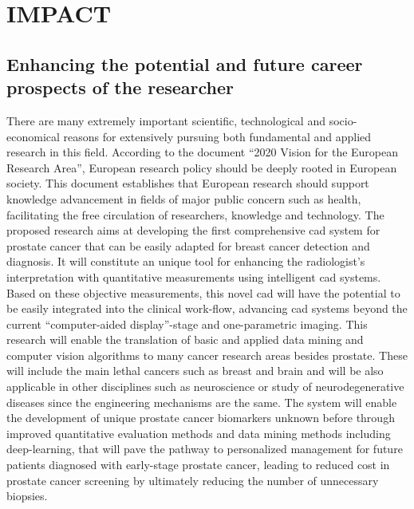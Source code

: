 \section{IMPACT}
\label{sec:impact}

\subsection{Enhancing the potential and future career prospects of the researcher}
\label{sec:enhancement}

There are many extremely important scientific, technological and socio-economical reasons for extensively pursuing both fundamental and applied research in this field.
According to the document ``2020 Vision for the European Research Area'', European research policy should be deeply rooted in European society.
This document establishes that European research should support knowledge advancement in fields of major public concern such as health, facilitating the free circulation of researchers, knowledge and technology.
The proposed research aims at developing the first comprehensive \ac{cad} system for prostate cancer that can be easily adapted for breast cancer detection and diagnosis.
It will constitute an unique tool for enhancing the radiologist's interpretation with quantitative measurements using intelligent \ac{cad} systems.
Based on these objective measurements, this novel \ac{cad} will have the potential to be easily integrated into the clinical work-flow, advancing \ac{cad} systems beyond the current ``computer-aided display''-stage and one-parametric imaging.
This research will enable the translation of basic and applied data mining and computer vision algorithms to many cancer research areas besides prostate. 
These will include the main lethal cancers such as breast and brain and will be also applicable in other disciplines such as neuroscience or study of neurodegenerative diseases since the engineering mechanisms are the same.
The system will enable the development of unique prostate cancer biomarkers unknown before through improved quantitative evaluation methods and data mining methods including deep-learning, that will pave the pathway to personalized management for future patients diagnosed with early-stage prostate cancer, leading to reduced cost in prostate cancer screening by ultimately reducing the number of unnecessary biopsies.

